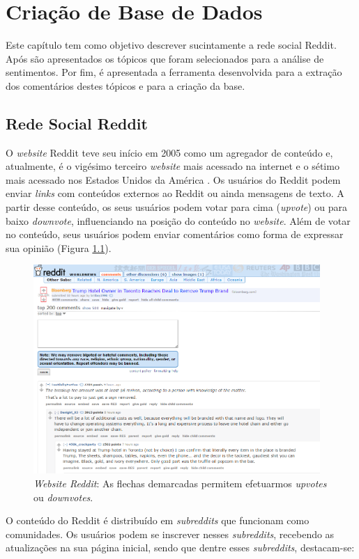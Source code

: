 \chapter{Criação de Base de Dados}
\label{cap:banco}
Este capítulo tem como objetivo descrever sucintamente a rede social Reddit.
Após são apresentados os tópicos que foram selecionados para a análise de
sentimentos. Por fim, é apresentada a ferramenta desenvolvida para a extração
dos comentários destes tópicos e para a criação da base.
\section{Rede Social Reddit}
\label{cap:Reddit}

O \textit{website} Reddit teve seu início em 2005 como um agregador de
conteúdo e, atualmente, é o vigésimo terceiro \textit{website} mais acessado na
internet e o sétimo mais acessado nos Estados Unidos da América \cite{alexa}.
Os usuários do Reddit podem enviar \textit{links} com conteúdos externos
ao Reddit ou ainda mensagens de texto. A partir desse conteúdo, os seus
usuários podem votar para cima (\textit{upvote}) ou para baixo \textit{downvote},
influenciando na posição do conteúdo no \textit{website}. Além de votar no conteúdo, seus usuários podem enviar comentários como
forma de expressar sua opinião (Figura \ref{fig:reddit}).

\begin{figure}[!htbp]
\centering
\includegraphics[height=300px]{imagens/reddit.png}
\caption{\textit{Website Reddit}:  As flechas demarcadas permitem efetuarmos
\textit{upvotes} ou \textit{downvotes}.}
\label{fig:reddit}
\end{figure}

O conteúdo do Reddit é distribuído em \textit{subreddits} que funcionam como
comunidades. Os usuários podem se inscrever nesses
\textit{subreddits}, recebendo as atualizações na sua página inicial, sendo
que dentre esses \textit{subreddits}, destacam-se:


